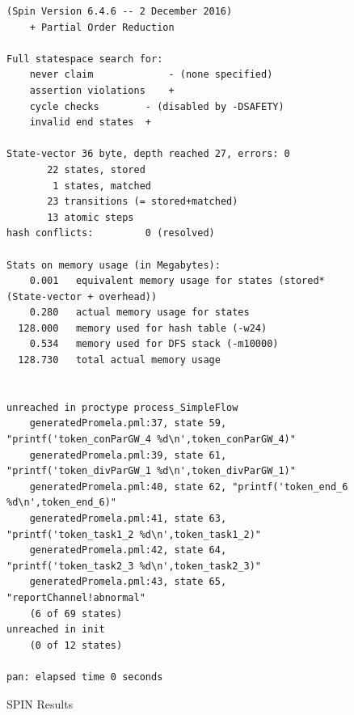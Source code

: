 \documentclass[11pt,twocolumn]{article}
\begin{document}
\begin{figure}
   \caption{SPIN Results}
  \label{fig:spinResults}


\begin{lstlisting}
(Spin Version 6.4.6 -- 2 December 2016)
	+ Partial Order Reduction

Full statespace search for:
	never claim         	- (none specified)
	assertion violations	+
	cycle checks       	- (disabled by -DSAFETY)
	invalid end states	+

State-vector 36 byte, depth reached 27, errors: 0
       22 states, stored
        1 states, matched
       23 transitions (= stored+matched)
       13 atomic steps
hash conflicts:         0 (resolved)

Stats on memory usage (in Megabytes):
    0.001	equivalent memory usage for states (stored*(State-vector + overhead))
    0.280	actual memory usage for states
  128.000	memory used for hash table (-w24)
    0.534	memory used for DFS stack (-m10000)
  128.730	total actual memory usage


unreached in proctype process_SimpleFlow
	generatedPromela.pml:37, state 59, "printf('token_conParGW_4 %d\n',token_conParGW_4)"
	generatedPromela.pml:39, state 61, "printf('token_divParGW_1 %d\n',token_divParGW_1)"
	generatedPromela.pml:40, state 62, "printf('token_end_6 %d\n',token_end_6)"
	generatedPromela.pml:41, state 63, "printf('token_task1_2 %d\n',token_task1_2)"
	generatedPromela.pml:42, state 64, "printf('token_task2_3 %d\n',token_task2_3)"
	generatedPromela.pml:43, state 65, "reportChannel!abnormal"
	(6 of 69 states)
unreached in init
	(0 of 12 states)

pan: elapsed time 0 seconds

\end{lstlisting}
\end{figure}




\end{document}
